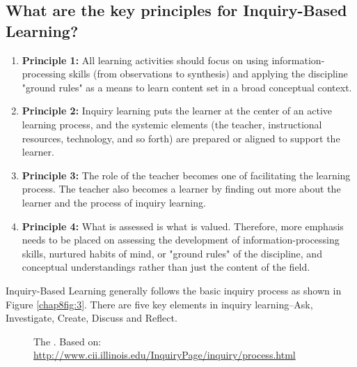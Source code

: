 \subsection*{What are the key principles for Inquiry-Based Learning?}
\begin{definition}
\begin{enumerate}
\item \textbf{Principle 1:} All learning activities should focus on using information-processing skills (from observations to synthesis) and applying the discipline "ground rules" as a means to learn content set in a
broad conceptual context.
\item \textbf{Principle 2:} Inquiry learning puts the learner at the center of an active learning process, and the systemic
elements (the teacher, instructional resources, technology, and so forth) are prepared or aligned to support the learner.
\item \textbf{Principle 3:} The role of the teacher becomes one of facilitating the learning process. The teacher also becomes a learner by finding out more about the learner and the process of inquiry learning.
\item \textbf{Principle 4:} What is assessed is what is valued. Therefore, more emphasis needs to be placed on assessing the development of information-processing skills, nurtured habits of mind, or "ground rules" of
the discipline, and conceptual understandings rather than just the content of the field.
\end{enumerate}
\end{definition}
Inquiry-Based Learning generally follows the basic inquiry process as shown in Figure \eqref{chap8fig:3}.
There are five key elements in inquiry learning--Ask, Investigate, Create, Discuss and Reflect.
\begin{figure}[!h]
\centering
{}
\caption{The . Based on: \url{http://www.cii.illinois.edu/InquiryPage/inquiry/process.html}}
\label{chap8fig:3}
\end{figure}
